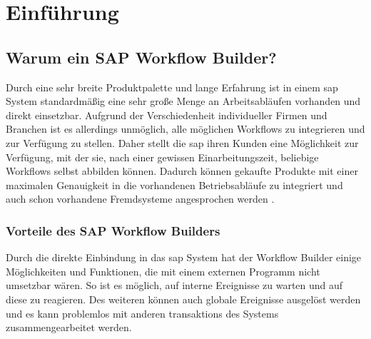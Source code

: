 \section{Einführung}
\subsection{Warum ein SAP Workflow Builder?}
\label{sec:warum-wf-builder}
Durch eine sehr breite Produktpalette und lange Erfahrung ist in einem \gls{sap} System standardmäßig eine sehr große Menge an Arbeitsabläufen vorhanden und direkt einsetzbar. Aufgrund der Verschiedenheit individueller Firmen und Branchen ist es allerdings unmöglich, alle möglichen Workflows zu integrieren und zur Verfügung zu stellen. Daher stellt die \gls{sap} ihren Kunden eine Möglichkeit zur Verfügung, mit der sie, nach einer gewissen Einarbeitungszeit, beliebige Workflows selbst abbilden können. Dadurch können gekaufte Produkte mit einer maximalen Genauigkeit in die vorhandenen Betriebsabläufe zu integriert und auch schon vorhandene Fremdsysteme angesprochen werden \cite{SAPHelpWf}.

\subsubsection{Vorteile des SAP Workflow Builders}
\label{sec:vorteile-sap-wf-builder}
Durch die direkte Einbindung in das \gls{sap} System hat der Workflow Builder einige Möglichkeiten und Funktionen, die mit einem externen Programm nicht umsetzbar wären. So ist es möglich, auf interne Ereignisse zu warten und auf diese zu reagieren. Des weiteren können auch globale Ereignisse ausgelöst werden und es kann problemlos mit anderen \glspl{transaktion} des Systems zusammengearbeitet werden. 

